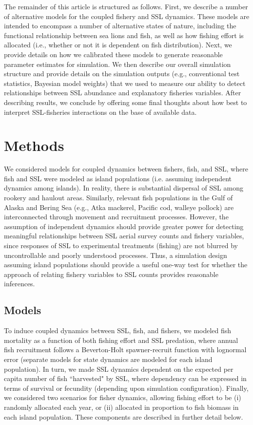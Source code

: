 \documentclass[nonumbib,leqno]{nrc1}
\begin{document}
The remainder of this article is structured as follows.  First, we describe a number of alternative models for the coupled fishery and SSL dynamics.  These models are intended to encompass a number of
alternative states of nature, including the functional relationship between sea lions and fish, as well as
how fishing effort is allocated (i.e., whether or not it is dependent on fish distribution).  Next, we provide details on how we calibrated these models to generate reasonable parameter estimates for simulation.  We then describe our overall simulation structure and provide details on the simulation outputs (e.g., conventional test statistics, Bayesian model weights) that we used to measure our ability to detect relationships between SSL abundance and explanatory fisheries variables.  After describing results, we conclude by offering some final thoughts about how best to interpret SSL-fisheries interactions on the base of available data.


\section{Methods}

We considered models for coupled dynamics between fishers, fish, and SSL, where fish and SSL were modeled as island populations (i.e. assuming independent dynamics among islands).  In reality, there is substantial dispersal of SSL among rookery and haulout areas.  Similarly, relevant fish populations in the Gulf of Alaska and Bering Sea (e.g., Atka mackerel, Pacific cod, walleye pollock) are interconnected through movement and recruitment processes.  However, the assumption of independent dynamics should provide greater power for detecting meaningful relationships between SSL aerial survey counts and fishery variables, since responses of SSL to experimental treatments (fishing) are not blurred by uncontrollable and poorly understood processes.  Thus, a simulation design assuming island populations should provide a useful one-way test for whether the approach of relating fishery variables to SSL counts provides reasonable inferences.

\subsection{Models}


To induce coupled dynamics between SSL, fish, and fishers, we modeled
fish mortality as a function of both fishing effort and SSL predation, where annual fish recruitment follows a Beverton-Holt spawner-recruit function \citep{Beverton1957} with lognormal error (separate models for state dynamics are modeled for each island population).  In turn, we made SSL dynamics dependent on the expected per capita number of fish ``harvested" by SSL, where dependency can be expressed in terms of survival or fecundity (depending upon simulation configuration).  Finally, we considered two scenarios for fisher dynamics, allowing fishing effort to be (i) randomly allocated each year, or (ii) allocated in proportion to fish biomass in each island population.  These components are described in further detail below.
\end{document}
